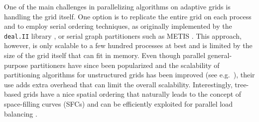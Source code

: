 One of the main challenges in parallelizing algorithms on adaptive grids is
handling the grid itself.
One option is to replicate the entire grid on each process and to employ serial
ordering techniques, as originally implemented by the \texttt{deal.II} library
\cite{Bangerth;Hartmann;Kanschat:07:deal.II----a-General}, or serial
graph partitioners such as METIS \cite{KarypisKumar95}.
%
%
This approach, however, is only scalable to a few hundred processes at best and
is limited by the size of the grid itself that can fit in memory.
Even though parallel general-purpose partitioners have since been popularized
\cite{Karypis;Kumar:98:A-parallel-algorithm,
Boman;Catalyurek;Chevalier;etal:12:The-Zoltan-and-Isorr} and
the scalability of partitioning algorithms for unstructured grids
has been improved (see e.g.\ \cite{SahniZhouShephardEtAl09}),
their use
adds extra overhead that can limit the overall scalability.
Interestingly, tree-based grids have a nice spatial ordering that naturally
leads to the concept of space-filling curves (SFCs) and can be efficiently
exploited for parallel load balancing
\cite{Aluru;Sevilgen:97:Parallel-domain-deco, GriebelZumbusch99,
      Campbell;Devine;Flaherty;etal:03:Dynamic-octree-load-}.


